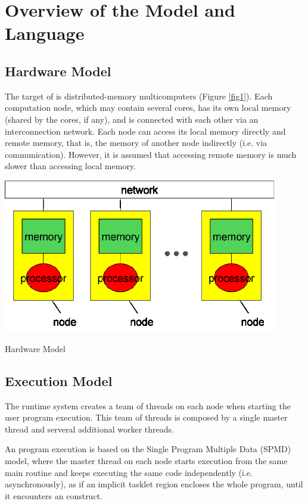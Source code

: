 \chapter{Overview of the {\XACC} Model and Language}
\label{chap: overview}

\section{Hardware Model}

The target of {\XMP} is distributed-memory multicomputers (Figure
\ref{fig1}). Each computation node, which may contain several cores, has
its own local memory (shared by the cores, if any), and is connected
with each other via an interconnection network.
%
Each node can access its local memory directly and remote memory, that
is, the memory of another node indirectly (i.e. via
communication). However, it is assumed that accessing remote memory is 
much slower than accessing local memory.

\begin{myfigure}
\includegraphics[width=12cm]{figs/Fig1.eps}
  \caption{Hardware Model}\label{fig1}
\end{myfigure}

\section{Execution Model}

The {\XMP} runtime system creates a team of threads on each node
when starting the user program execution. This team of threads is
composed by a single master thread and serveral additional worker
threads.

An {\XMP} program execution is based on the Single Program
Multiple Data (SPMD) model, where the master thread on each node
starts execution from the same main routine and keeps executing the
same code independently (i.e. asynchronously), as if an implicit
tasklet region encloses the whole program, until it encounters an
{\XMP} construct.

